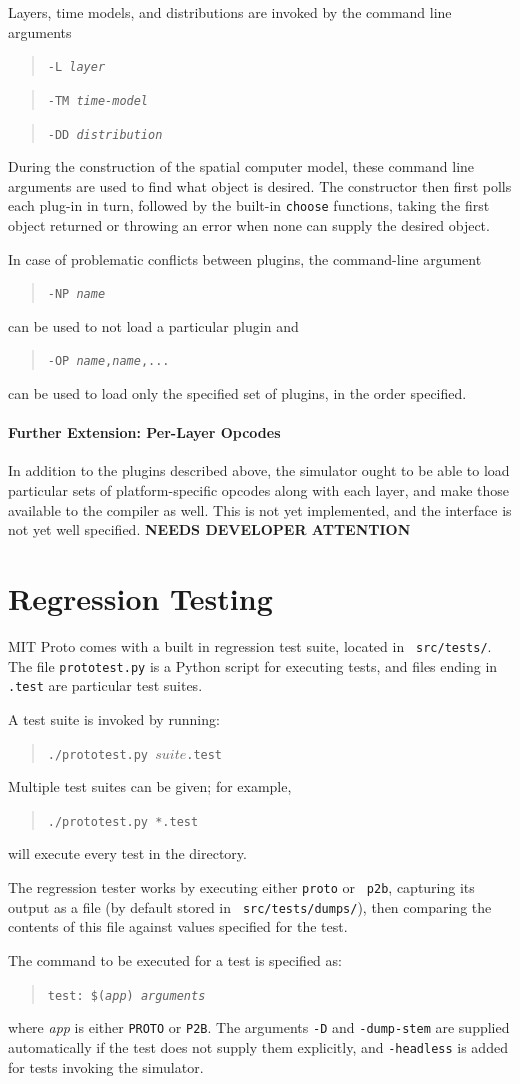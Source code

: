 \documentclass{article}
\newcommand\fixme{{\bf NEEDS DEVELOPER ATTENTION}}
\newcommand\code[1]{\begin{quote}\var{#1}\end{quote}}
\newcommand\var[1]{{\tt #1}}
\begin{document}
Layers, time models, and distributions are invoked by the command line
arguments \code{-L {\it layer}} \code{-TM {\it time-model}} \code{-DD
  {\it distribution}}  

During the construction of the spatial computer model, these command
line arguments are used to find what object is desired.  The
constructor then first polls each plug-in in turn, followed by the
built-in \var{choose} functions, taking the first object returned or
throwing an error when none can supply the desired object.

In case of problematic conflicts between plugins, the command-line
argument \code{-NP {\it name}} can be used to not load a particular
plugin and \code{-OP {\it name},{\it name},...} can be used to load
only the specified set of plugins, in the order specified.

\paragraph{Further Extension: Per-Layer Opcodes}

In addition to the plugins described above, the simulator ought to be
able to load particular sets of platform-specific opcodes along with
each layer, and make those available to the compiler as well.  This
is not yet implemented, and the interface is not yet well specified.
\fixme{}


\section{Regression Testing}

MIT Proto comes with a built in regression test suite, located in {\tt
  src/tests/}.  The file {\tt prototest.py} is a Python script for
executing tests, and files ending in {\tt .test} are particular test suites.

A test suite is invoked by running: \code{./prototest.py $suite$.test}
Multiple test suites can be given; for example, \code{./prototest.py
  *.test} will execute every test in the directory.

The regression tester works by executing either {\tt proto} or {\tt
  p2b}, capturing its output as a file (by default stored in {\tt
  src/tests/dumps/}), then comparing the contents of this file against
values specified for the test.

The command to be executed for a test is specified as: \code{test:
  \$({\it app}) {\it arguments}} where {\it app} is either \var{PROTO}
or \var{P2B}.  The arguments \var{-D} and \var{-dump-stem} are
supplied automatically if the test does not supply them explicitly,
and \var{-headless} is added for tests invoking the simulator.
\end{document}
